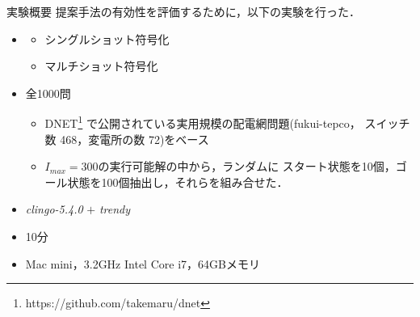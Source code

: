 \documentclass[dvipdfmx,11pt]{beamer}
\begin{document}
\begin{frame}{実験概要}
  \renewcommand{\thefootnote}{\fnsymbol{footnote}}
  \setcounter{footnote}{1}
  提案手法の有効性を評価するために，以下の実験を行った．
  \vfill
  \begin{itemize}
  \item {}
    \begin{itemize}
    \item シングルショット符号化
    \item マルチショット符号化
    \end{itemize}
  \item {} 全1000問
    \begin{itemize}
    \item DNET\footnote{https://github.com/takemaru/dnet}
      で公開されている実用規模の配電網問題(\textsf{fukui-tepco}，
      スイッチ数 468，変電所の数 72)をベース
     \item $I_{max}=300$の実行可能解の中から，ランダムに
           スタート状態を10個，ゴール状態を100個抽出し，それらを組み合せた．
    \end{itemize}
  \item {} \textit{clingo-5.4.0} $+$ \textit{trendy}
   \item {} 10分 
  \item {} Mac mini，3.2GHz Intel Core i7，64GBメモリ
  \end{itemize}
\end{frame}
\end{document}
